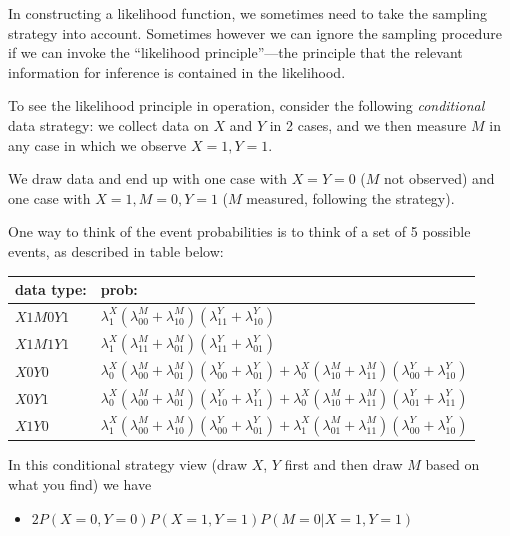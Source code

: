 \documentclass[
  12pt,
]{book}
\providecommand{\tightlist}{%
  \setlength{\itemsep}{0pt}\setlength{\parskip}{0pt}}
\begin{document}
In constructing a likelihood function, we sometimes need to take the sampling strategy into account. Sometimes however we can ignore the sampling procedure if we can invoke the ``likelihood principle''---the principle that the relevant information for inference is contained in the likelihood.

To see the likelihood principle in operation, consider the following \emph{conditional} data strategy: we collect data on \(X\) and \(Y\) in 2 cases, and we then measure \(M\) in any case in which we observe \(X=1, Y=1\).

We draw data and end up with one case with \(X=Y=0\) (\(M\) not observed) and one case with \(X=1, M=0, Y=1\) (\(M\) measured, following the strategy).

One way to think of the event probabilities is to think of a set of 5 possible events, as described in table below:

\begin{longtable}[]{@{}
  >{\raggedright\arraybackslash}p{}
  >{\raggedright\arraybackslash}p{}@{}}
\toprule
data type: & prob: \\
\midrule
\endhead
\(X1M0Y1\) & \(\lambda^X_1(\lambda^M_{00}+\lambda^M_{10})(\lambda^Y_{11}+\lambda^Y_{10})\) \\
\(X1M1Y1\) & \(\lambda^X_1(\lambda^M_{11}+\lambda^M_{01})(\lambda^Y_{11}+\lambda^Y_{01})\) \\
\(X0Y0\) & \(\lambda^X_0(\lambda^M_{00}+\lambda^M_{01})(\lambda^Y_{00}+\lambda^Y_{01}) + \lambda^X_0(\lambda^M_{10}+\lambda^M_{11})(\lambda^Y_{00}+\lambda^Y_{10})\) \\
\(X0Y1\) & \(\lambda^X_0(\lambda^M_{00}+\lambda^M_{01})(\lambda^Y_{10}+\lambda^Y_{11}) + \lambda^X_0(\lambda^M_{10}+\lambda^M_{11})(\lambda^Y_{01}+\lambda^Y_{11})\) \\
\(X1Y0\) & \(\lambda^X_1(\lambda^M_{00}+\lambda^M_{10})(\lambda^Y_{00}+\lambda^Y_{01}) + \lambda^X_1(\lambda^M_{01}+\lambda^M_{11})(\lambda^Y_{00}+\lambda^Y_{10})\) \\
\bottomrule
\end{longtable}

In this conditional strategy view (draw \(X\), \(Y\) first and then draw \(M\) based on what you find) we have

\begin{itemize}
\tightlist
\item
  \(2P(X=0, Y=0)P(X=1, Y=1)P(M=0 | X=1, Y=1)\)
\end{itemize}
\end{document}
